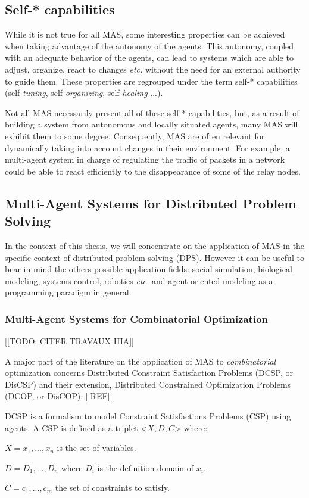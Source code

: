 \subsection{Self-* capabilities}

While it is not true for all MAS, some interesting properties can be achieved when taking advantage of the autonomy of the agents. This autonomy, coupled with an adequate behavior of the agents, can lead to systems which are able to adjust, organize, react to changes \emph{etc.} without the need for an external authority to guide them. These properties are regrouped under the term self-* capabilities (self-\emph{tuning}, self-\emph{organizing}, self-\emph{healing} ...).

Not all MAS necessarily present all of these self-* capabilities, but, as a result of building a system from autonomous and locally situated agents, many MAS will exhibit them to some degree. Consequently, MAS are often relevant for dynamically taking into account changes in their environment. For example, a multi-agent system in charge of regulating the traffic of packets in a network could be able to react efficiently to the disappearance of some of the relay nodes.

\subsection{Multi-Agent Systems for Distributed Problem Solving}

In the context of this thesis, we will concentrate on the application of MAS in the specific context of distributed problem solving (DPS). However it can be useful to bear in mind the others possible application fields: social simulation, biological modeling, systems control, robotics \emph{etc.} and agent-oriented modeling as a programming paradigm in general.

\subsubsection{Multi-Agent Systems for Combinatorial Optimization}

[[TODO: CITER TRAVAUX IIIA]]

A major part of the literature on the application of MAS to \emph{combinatorial} optimization concerns Distributed Constraint Satisfaction Problems (DCSP, or DisCSP) and their extension, Distributed Constrained Optimization Problems (DCOP, or DisCOP). [[REF]]

DCSP is a formalism to model Constraint Satisfactions Problems (CSP) using agents. A CSP is defined as a triplet <$X,D,C$> where:
\begin{compactitem}
\item $X = {x_1, ..., x_n}$ is the set of variables.
\item $D = {D_1, ..., D_n}$ where $D_i$ is the definition domain of $x_i$.
\item $C ={c_1, ..., c_m}$ the set of constraints to satisfy.
\end{compactitem}

